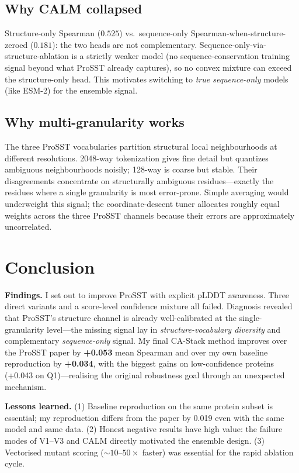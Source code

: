 \documentclass[11pt,a4paper]{article}
\begin{document}
\subsection{Why CALM collapsed}
Structure-only Spearman ($0.525$) vs.\ sequence-only
Spearman-when-structure-zeroed ($0.181$): the two heads are not
complementary. Sequence-only-via-structure-ablation is a strictly
weaker model (no sequence-conservation training signal beyond what
ProSST already captures), so no convex mixture can exceed the
structure-only head. This motivates switching to \emph{true
sequence-only} models (like ESM-2) for the ensemble signal.

\subsection{Why multi-granularity works}
The three ProSST vocabularies partition structural local neighbourhoods
at different resolutions. 2048-way tokenization gives fine detail but
quantizes ambiguous neighbourhoods noisily; 128-way is coarse but
stable. Their disagreements concentrate on structurally ambiguous
residues---exactly the residues where a single granularity is most
error-prone. Simple averaging would underweight this signal; the
coordinate-descent tuner allocates roughly equal weights across the
three ProSST channels because their errors are approximately
uncorrelated.

\section{Conclusion}

\textbf{Findings.} I set out to improve ProSST with explicit pLDDT
awareness. Three direct variants and a score-level confidence mixture
all failed. Diagnosis revealed that ProSST's structure channel is
already well-calibrated at the single-granularity level---the missing
signal lay in \emph{structure-vocabulary diversity} and complementary
\emph{sequence-only} signal. My final CA-Stack method improves over
the ProSST paper by \textbf{+0.053} mean Spearman and over my own
baseline reproduction by \textbf{+0.034}, with the biggest gains on
low-confidence proteins (+0.043 on Q1)---realising the original
robustness goal through an unexpected mechanism.

\textbf{Lessons learned.} (1) Baseline reproduction on the same
protein subset is essential; my reproduction differs from the paper
by 0.019 even with the same model and same data. (2) Honest negative
results have high value: the failure modes of V1--V3 and CALM directly
motivated the ensemble design. (3) Vectorised mutant scoring
($\sim\!10$--$50\times$ faster) was essential for the rapid ablation
cycle.
\end{document}
